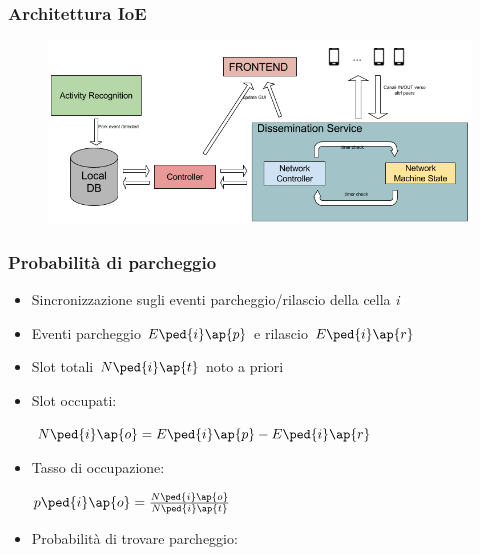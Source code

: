 \documentclass{beamer}
\begin{document}
\begin{frame}
\frametitle{Architettura IoE}
\begin{figure}
\includegraphics[scale=0.25]{img/arch_soft.png}
\end{figure}
\end{frame}


\begin{frame}
\frametitle{Probabilità di parcheggio}

\begin{itemize}
  \item Sincronizzazione sugli eventi parcheggio/rilascio della cella \textit{i}
  \item Eventi parcheggio $E\ped{i}\ap{p}$ e rilascio $E\ped{i}\ap{r}$
  \item Slot totali $N\ped{i}\ap{t}$ noto a priori
  \item Slot occupati:
  \\
  {\centering $N\ped{i}\ap{o} = E\ped{i}\ap{p} - E\ped{i}\ap{r}$\par}
  \vspace{2mm}
  \item Tasso di occupazione:
  \\
  {\centering $p\ped{i}\ap{o} = \frac{N\ped{i}\ap{o}}{N\ped{i}\ap{t}}$\par}
  \vspace{2mm}
  \item Probabilità di trovare parcheggio:
  \\
  \vspace{4mm}
  \centering {}
\end{itemize}
\end{frame}
\end{document}
